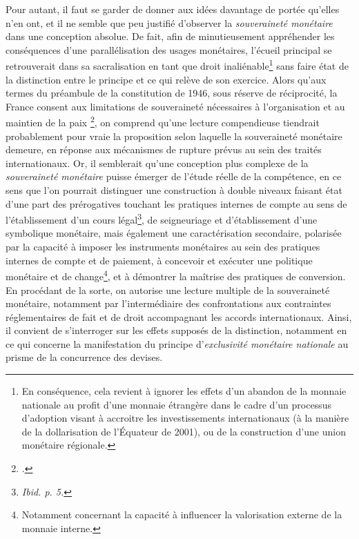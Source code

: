 {Pour autant, il faut se garder de donner aux idées davantage de portée qu'elles n'en ont, et il ne semble que peu justifié d'observer la \emph{souveraineté monétaire} dans une conception absolue. De fait, afin de minutieusement appréhender les conséquences d'une parallélisation des usages monétaires, l'écueil principal se retrouverait dans sa sacralisation en tant que droit inaliénable\footnote{En conséquence, cela revient à ignorer les effets d'un abandon de la monnaie nationale au profit d'une monnaie étrangère dans le cadre d'un processus d'adoption visant à accroitre les investissements internationaux (à la manière de la dollarisation de l'Équateur de 2001), ou de la construction d'une union monétaire régionale.} sans faire état de la distinction entre le principe et ce qui relève de son exercice. Alors qu'aux termes du préambule de la constitution de 1946, \og sous réserve de réciprocité, la France consent aux limitations de souveraineté nécessaires à l'organisation et au maintien de la paix \fg{}\footnote{.}, on comprend qu'une lecture compendieuse tiendrait probablement pour vraie la proposition selon laquelle la souveraineté monétaire demeure, en réponse aux mécanismes de rupture prévus au sein des traités internationaux. Or, il semblerait qu'une conception plus complexe de la \emph{souveraineté monétaire} puisse émerger de l'étude réelle de la compétence, en ce sens que l'on pourrait distinguer une construction à double niveaux faisant état d'une part des prérogatives touchant les pratiques internes de compte au sens de l'établissement d'un cours légal\footnote{\emph{Ibid. p. 5.}}, de seigneuriage et d'établissement d'une symbolique monétaire, mais également une caractérisation secondaire, polarisée par la capacité à imposer les instruments monétaires au sein des pratiques internes de compte et de paiement, à concevoir et exécuter une politique monétaire et de change\footnote{Notamment concernant la capacité à influencer la valorisation externe de la monnaie interne.}, et à démontrer la maîtrise des pratiques de conversion. En procédant de la sorte, on autorise une lecture multiple de la souveraineté monétaire, notamment par l'intermédiaire des confrontations aux contraintes réglementaires de fait et de droit accompagnant les accords internationaux. Ainsi, il convient de s'interroger sur les effets supposés de la distinction, notamment en ce qui concerne la manifestation du principe d'\emph{exclusivité monétaire nationale} au prisme de la concurrence des devises.\par

}
